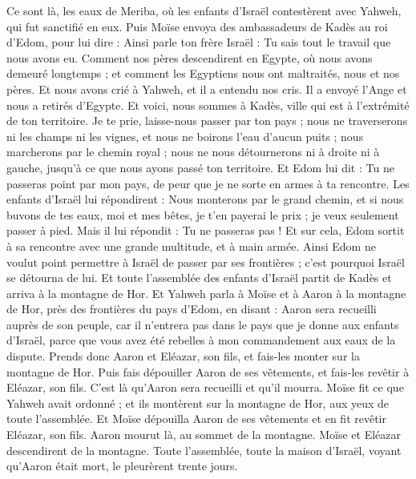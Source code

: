 \begin{multicols}{2}
Ce sont là, les eaux de Meriba, où les enfants d'Israël contestèrent avec Yahweh, qui fut sanctifié en eux.
Puis Moïse envoya des ambassadeurs de Kadès au roi d'Edom, pour lui dire : Ainsi parle ton frère Israël : Tu sais tout le travail que nous avons eu.
Comment nos pères descendirent en Egypte, où nous avons demeuré longtemps ; et comment les Egyptiens nous ont maltraités, nous et nos pères.
Et nous avons crié à Yahweh, et il a entendu nos cris. Il a envoyé l'Ange et nous a retirés d'Egypte. Et voici, nous sommes à Kadès, ville qui est à l'extrémité de ton territoire.
Je te prie, laisse-nous passer par ton pays ; nous ne traverserons ni les champs ni les vignes, et nous ne boirons l'eau d'aucun puits ; nous marcherons par le chemin royal ; nous ne nous détournerons ni à droite ni à gauche, jusqu'à ce que nous ayons passé ton territoire.
Et Edom lui dit : Tu ne passeras point par mon pays, de peur que je ne sorte en armes à ta rencontre.
Les enfants d'Israël lui répondirent : Nous monterons par le grand chemin, et si nous buvons de tes eaux, moi et mes bêtes, je t'en payerai le prix ; je veux seulement passer à pied.
Mais il lui répondit : Tu ne passeras pas ! Et sur cela, Edom sortit à sa rencontre avec une grande multitude, et à main armée.
Ainsi Edom ne voulut point permettre à Israël de passer par ses frontières ; c’est pourquoi Israël se détourna de lui.
Et toute l'assemblée des enfants d'Israël partit de Kadès et arriva à la montagne de Hor.
Et Yahweh parla à Moïse et à Aaron à la montagne de Hor, près des frontières du pays d'Edom, en disant :
Aaron sera recueilli auprès de son peuple, car il n'entrera pas dans le pays que je donne aux enfants d'Israël, parce que vous avez été rebelles à mon commandement aux eaux de la dispute.
Prends donc Aaron et Eléazar, son fils, et fais-les monter sur la montagne de Hor.
Puis fais dépouiller Aaron de ses vêtements, et fais-les revêtir à Eléazar, son fils. C'est là qu'Aaron sera recueilli et qu'il mourra.
Moïse fit ce que Yahweh avait ordonné ; et ils montèrent sur la montagne de Hor, aux yeux de toute l'assemblée.
Et Moïse dépouilla Aaron de ses vêtements et en fit revêtir Eléazar, son fils. Aaron mourut là, au sommet de la montagne. Moïse et Eléazar descendirent de la montagne.
Toute l'assemblée, toute la maison d'Israël, voyant qu'Aaron était mort, le pleurèrent trente jours.

\end{multicols}
